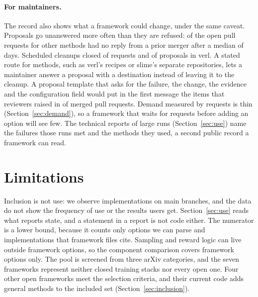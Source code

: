 \documentclass{article}
\begin{document}
\paragraph{For maintainers.} The record also shows what a framework could change, under the same caveat. Proposals go unanswered more often than they are refused: \NPROpenNoReply{} of the \NPROpen{} open pull requests for other methods had no reply from a prior merger after a median of \OpenPRMedianAge{} days. Scheduled cleanups closed \NReqStale{} of \NAttemptRequests{} requests and \PrverlAttStale{} of \PrverlAtt{} proposals in verl. A stated route for methods, such as verl's recipes or slime's separate repositories, lets a maintainer answer a proposal with a destination instead of leaving it to the cleanup. A proposal template that asks for the failure, the change, the evidence and the configuration field would put in the first message the items that reviewers raised in \RevMAny{} of \RevMN{} merged pull requests. Demand measured by requests is thin (Section~\ref{sec:demand}), so a framework that waits for requests before adding an option will see few. The technical reports of large runs (Section~\ref{sec:use}) name the failures those runs met and the methods they used, a second public record a framework can read.

\section{Limitations}
\label{sec:limits}

Inclusion is not use: we observe implementations on main branches, and the data do not show the frequency of use or the results users get. Section~\ref{sec:use} reads what \NReports{} reports state, and a statement in a report is not code either. The numerator is a lower bound, because it counts only options we can parse and implementations that framework files cite. Sampling and reward logic can live outside framework options, so the component comparison covers framework options only. The pool is screened from three arXiv categories, and the seven frameworks represent neither closed training stacks nor every open one. Four other open frameworks meet the selection criteria, and their current code adds \NFwExtraNew{} general methods to the included set (Section~\ref{sec:inclusion}).
\end{document}
